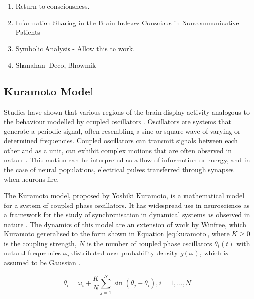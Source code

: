 \documentclass[a4paper,11pt]{article}
\begin{document}
\begin{enumerate}
\item{Return to consciousness.}
\item{Information Sharing in the Brain Indexes Conscious in Noncommunicative Patients}
\item{Symbolic Analysis - Allow this to work.}
\item{Shanahan, Deco, Bhowmik}
\end{enumerate}

\subsection{Kuramoto Model}
\label{KuramotoModel}
Studies have shown that various regions of the brain display activity analogous to the behaviour modelled by coupled oscillators \cite{Bennett2004}. Oscillators are systems that generate a periodic signal, often resembling a sine or square wave \cite{Westra1999} of varying or determined frequencies. Coupled oscillators can transmit signals between each other and as a unit, can exhibit complex motions that are often observed in nature \cite{Wolfs2004}. This motion can be interpreted as a flow of information or energy, and in the case of neural populations, electrical pulses transferred through synapses when neurons fire.

The Kuramoto model, proposed by Yoshiki Kuramoto, is a mathematical model for a system of coupled phase oscillators. It has widespread use in neuroscience as a framework for the study of synchronisation in dynamical systems as observed in nature \cite{Cumin2007}. The dynamics of this model are an extension of work by Winfree, which Kuramoto generalised to the form shown in Equation \ref{eq:kuramoto}, where $K \geq 0$ is the coupling strength, $N$ is the number of coupled phase oscillators $\theta_{i}(t)$ with natural frequencies $\omega_{i}$ distributed over probability density $g(\omega)$, which is assumed to be Gaussian \cite{Strogatz2000}.

\begin{equation} \label{eq:kuramoto}
\dot{\theta_i} = \omega_i + \frac{K}{N} \sum_{j=1}^{N} \sin(\theta_j - \theta_i), i = 1, ..., N
\end{equation}

\end{document}
